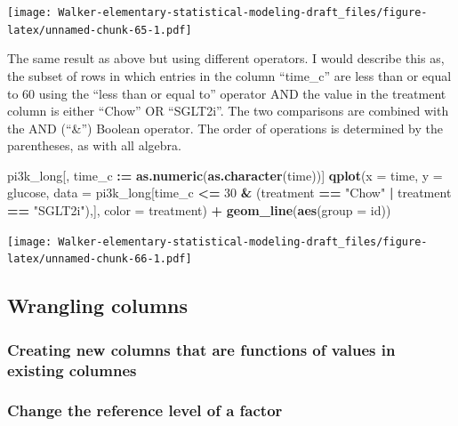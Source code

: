 \documentclass[]{book}
\newenvironment{Shaded}{\begin{snugshade}}{\end{snugshade}}
\newcommand{\DataTypeTok}[1]{\textcolor[rgb]{0.13,0.29,0.53}{#1}}
\newcommand{\DecValTok}[1]{\textcolor[rgb]{0.00,0.00,0.81}{#1}}
\newcommand{\ErrorTok}[1]{\textcolor[rgb]{0.64,0.00,0.00}{\textbf{#1}}}
\newcommand{\KeywordTok}[1]{\textcolor[rgb]{0.13,0.29,0.53}{\textbf{#1}}}
\newcommand{\NormalTok}[1]{#1}
\newcommand{\OperatorTok}[1]{\textcolor[rgb]{0.81,0.36,0.00}{\textbf{#1}}}
\newcommand{\StringTok}[1]{\textcolor[rgb]{0.31,0.60,0.02}{#1}}
\begin{document}
\texttt{[image: Walker-elementary-statistical-modeling-draft\_files/figure-latex/unnamed-chunk-65-1.pdf]}

The same result as above but using different operators. I would describe this as, the subset of rows in which entries in the column ``time\_c'' are less than or equal to 60 using the ``less than or equal to'' operator AND the value in the treatment column is either ``Chow'' OR ``SGLT2i''. The two comparisons are combined with the AND (``\&'') Boolean operator. The order of operations is determined by the parentheses, as with all algebra.

\begin{Shaded}
\begin{Highlighting}[]
\NormalTok{pi3k_long[, time_c }\OperatorTok{:}\ErrorTok{=}\StringTok{ }\KeywordTok{as.numeric}\NormalTok{(}\KeywordTok{as.character}\NormalTok{(time))]}
\KeywordTok{qplot}\NormalTok{(}\DataTypeTok{x =}\NormalTok{ time,}
      \DataTypeTok{y =}\NormalTok{ glucose,}
      \DataTypeTok{data =}\NormalTok{ pi3k_long[time_c }\OperatorTok{<=}\StringTok{ }\DecValTok{30} \OperatorTok{&}\StringTok{ }\NormalTok{(treatment }\OperatorTok{==}\StringTok{ "Chow"} \OperatorTok{|}\StringTok{ }\NormalTok{treatment }\OperatorTok{==}\StringTok{ "SGLT2i"}\NormalTok{),],}
      \DataTypeTok{color =}\NormalTok{ treatment) }\OperatorTok{+}
\StringTok{  }\KeywordTok{geom_line}\NormalTok{(}\KeywordTok{aes}\NormalTok{(}\DataTypeTok{group =}\NormalTok{ id))}
\end{Highlighting}
\end{Shaded}

\texttt{[image: Walker-elementary-statistical-modeling-draft\_files/figure-latex/unnamed-chunk-66-1.pdf]}

\hypertarget{wrangling-columns}{%
\subsection{Wrangling columns}\label{wrangling-columns}}

\hypertarget{creating-new-columns-that-are-functions-of-values-in-existing-columnes}{%
\subsubsection{Creating new columns that are functions of values in existing columnes}\label{creating-new-columns-that-are-functions-of-values-in-existing-columnes}}

\hypertarget{change-the-reference-level-of-a-factor}{%
\subsubsection{Change the reference level of a factor}\label{change-the-reference-level-of-a-factor}}
\end{document}
